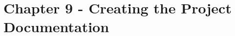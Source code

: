 \documentclass{tufte-book} %
\begin{document}
\chapter{Chapter 9 - Creating the Project Documentation}
\label{ch:9}
	
		


	


\backmatter




\printindex %
\end{document}
